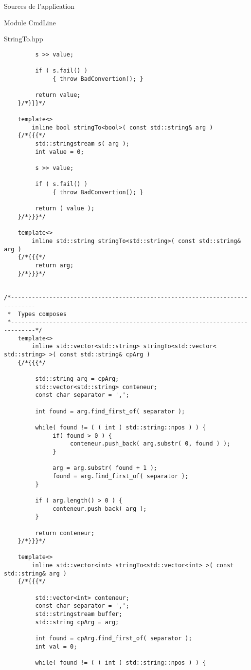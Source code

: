 \documentclass{article}
\begin{document}
\begin{section}{Sources de l'application}
\begin{subsection}{Module CmdLine}
\begin{paragraph}{StringTo.hpp}
\begin{verbatim}
         s >> value;

         if ( s.fail() )
              { throw BadConvertion(); }

         return value;
    }/*}}}*/

    template<>
        inline bool stringTo<bool>( const std::string& arg )
    {/*{{{*/
         std::stringstream s( arg );
         int value = 0;

         s >> value;

         if ( s.fail() )
              { throw BadConvertion(); }

         return ( value );
    }/*}}}*/

    template<>
        inline std::string stringTo<std::string>( const std::string& arg )
    {/*{{{*/
         return arg;
    }/*}}}*/


/*-----------------------------------------------------------------------------
 *  Types composes
 *-----------------------------------------------------------------------------*/
    template<>
        inline std::vector<std::string> stringTo<std::vector< std::string> >( const std::string& cpArg )
    {/*{{{*/

         std::string arg = cpArg;
         std::vector<std::string> conteneur;
         const char separator = ',';

         int found = arg.find_first_of( separator );

         while( found != ( ( int ) std::string::npos ) ) {
              if( found > 0 ) {
                   conteneur.push_back( arg.substr( 0, found ) );
              }

              arg = arg.substr( found + 1 );
              found = arg.find_first_of( separator );
         }

         if ( arg.length() > 0 ) {
              conteneur.push_back( arg );
         }

         return conteneur;
    }/*}}}*/
    
    template<>
        inline std::vector<int> stringTo<std::vector<int> >( const std::string& arg )
    {/*{{{*/

         std::vector<int> conteneur;
         const char separator = ',';
         std::stringstream buffer;
         std::string cpArg = arg;

         int found = cpArg.find_first_of( separator );
         int val = 0;

         while( found != ( ( int ) std::string::npos ) ) {


\end{verbatim}
\end{paragraph}
\end{subsection}
\end{section}
\end{document}
